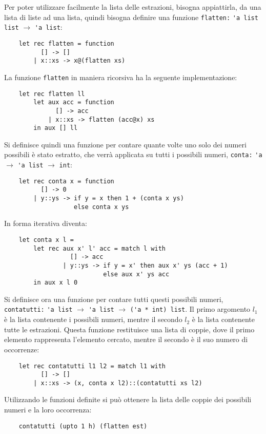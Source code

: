 \documentclass{article}
\numberwithin{equation}{subsection}
\begin{document}
Per poter utilizzare facilmente la lista delle estrazioni, bisogna appiattirla, da una lista di liste ad una lista, quindi bisogna definire una funzione \verb|flatten:| \verb|'a list list| $\rightarrow$ \verb|'a list|:
\begin{verbatim}
    let rec flatten = function
          [] -> []
        | x::xs -> x@(flatten xs)
\end{verbatim}
La funzione \verb|flatten| in maniera ricorsiva ha la seguente implementazione:
\begin{verbatim}
    let rec flatten ll 
        let aux acc = function 
              [] -> acc
            | x::xs -> flatten (acc@x) xs 
        in aux [] ll
\end{verbatim}
Si definisce quindi una funzione per contare quante volte uno solo dei numeri possibili è stato estratto, che verrà applicata su tutti i possibili numeri, \verb|conta:| \verb|'a| $\rightarrow$ \verb|'a list| $\rightarrow$ \verb|int|:
\begin{verbatim}
    let rec conta x = function
          [] -> 0
        | y::ys -> if y = x then 1 + (conta x ys)
                   else conta x ys
\end{verbatim}
In forma iterativa diventa:
\begin{verbatim}
    let conta x l =
        let rec aux x' l' acc = match l with
                  [] -> acc
                | y::ys -> if y = x' then aux x' ys (acc + 1)
                           else aux x' ys acc
        in aux x l 0
\end{verbatim}

Si definisce ora una funzione per contare tutti questi possibili numeri, \verb|contatutti:| \verb|'a list| $\rightarrow$ \verb|'a list| $\rightarrow$ \verb|('a * int) list|. Il primo argomento $l_1$ è la lista contenente i possibili numeri, mentre il secondo $l_2$ è la lista contenente tutte le estrazioni. 
Questa funzione restituisce una lista di coppie, dove il primo elemento rappresenta l'elemento cercato, mentre il secondo è il suo numero di occorrenze:
\begin{verbatim}
    let rec contatutti l1 l2 = match l1 with
          [] -> []
        | x::xs -> (x, conta x l2)::(contatutti xs l2)    
\end{verbatim}


Utilizzando le funzioni definite si può ottenere la lista delle coppie dei possibili numeri e la loro occorrenza:
\begin{verbatim}
    contatutti (upto 1 h) (flatten est)    
\end{verbatim}
\end{document}
